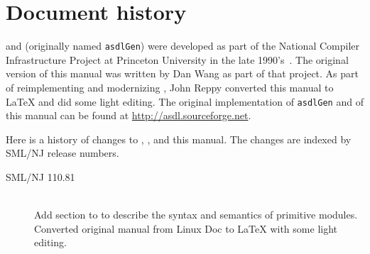 %
\chapter{Document history}
\label{ch:history}

\asdl{} and \asdlgen{} (originally named \texttt{asdlGen}) were developed as part
of the National Compiler Infrastructure Project at Princeton University in the
late 1990's~\cite{usenix:zephyr-asdl}.
The original version of this manual was written by Dan Wang as part of that project.
As part of reimplementing and modernizing \asdl{}, John Reppy converted this manual
to \LaTeX{} and did some light editing.
The original implementation of \texttt{asdlGen} and of this manual can be
found at \url{http://asdl.sourceforge.net}.

Here is a history of changes to \asdl{}, \asdlgen{}, and this manual.
The changes are indexed by SML/NJ release numbers.

\begin{description}
  \item[SML/NJ 110.81]
    \mbox{}\\[0.5em]
    Add section to  to describe the syntax and semantics of primitive modules.
    \\[0.5em]
    Converted original manual from Linux Doc to \LaTeX{} with some light editing.
\end{description}%
